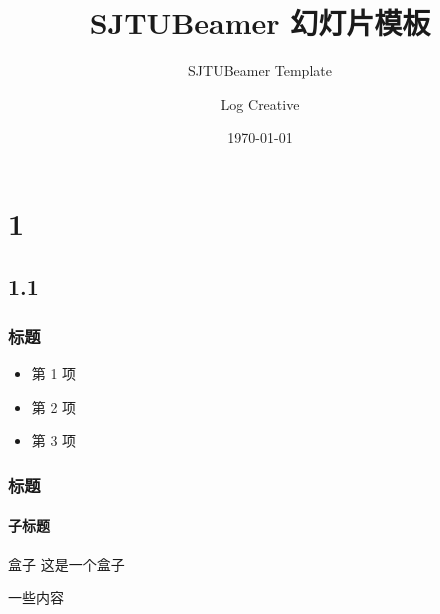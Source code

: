 \documentclass{beamer}
\title{\textsf{SJTUBeamer} 幻灯片模板}
\subtitle{SJTUBeamer Template}
\author{Log Creative}
\institute[]{github.com/LogCreative}
\date{\today}
\begin{document}
    

    \sjtutitle

    \section{1}
    \subsection{1.1}
    \begin{frame}
        \frametitle{标题}

        \begin{itemize}
            \item 第 1 项
            \item 第 2 项
            \item 第 3 项
        \end{itemize}

    \end{frame}

    \begin{frame}
        \frametitle{标题}
        \framesubtitle{子标题}

        \begin{block}{盒子}
            这是一个盒子
        \end{block}
    \end{frame}

    \begin{frame}
        一些内容
    \end{frame}
\end{document}
